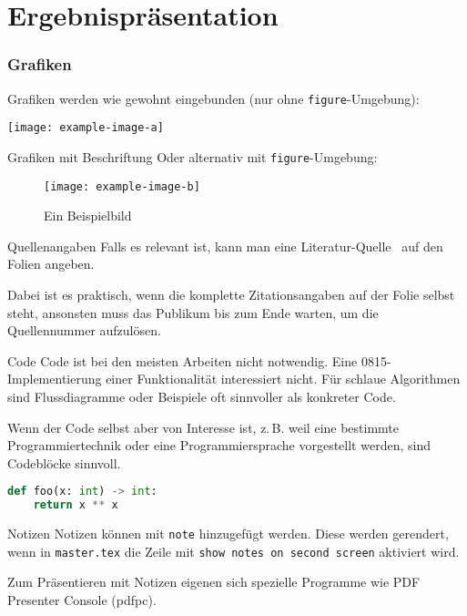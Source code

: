 \section{Ergebnispräsentation}

\begin{frame}
  \frametitle{Grafiken}
  Grafiken werden wie gewohnt eingebunden (nur ohne \texttt{figure}-Umgebung):
  \begin{center}
	    \texttt{[image: example-image-a]}
  \end{center}
\end{frame}

\begin{frame}{Grafiken mit Beschriftung}
Oder alternativ mit \texttt{figure}-Umgebung:
\begin{figure}
\texttt{[image: example-image-b]}
\caption{Ein Beispielbild}
\end{figure}
\end{frame}

\begin{frame}{Quellenangaben}
Falls es relevant ist, kann man eine Literatur-Quelle~ auf den Folien angeben.

Dabei ist es praktisch, wenn die komplette Zitationsangaben auf der Folie selbst steht, ansonsten muss das Publikum bis zum Ende warten, um die Quellennummer aufzulösen.
\end{frame}

\begin{frame}[fragile]{Code} %
    Code ist bei den meisten Arbeiten nicht notwendig. Eine 0815-Implementierung einer Funktionalität interessiert nicht. Für schlaue Algorithmen sind Flussdiagramme oder Beispiele oft sinnvoller als konkreter Code.
    
    Wenn der Code selbst aber von Interesse ist, z.\,B. weil eine bestimmte Programmiertechnik oder eine Programmiersprache vorgestellt werden, sind Codeblöcke sinnvoll.
   
\iffalse
\begin{verbatim}
def foo(x: int) -> int:
    return x ** x
\end{verbatim}

\inputminted[linenos=true]{java}{example.java}
\fi
\begin{lstlisting}[language=python]
def foo(x: int) -> int:
    return x ** x
\end{lstlisting}
\end{frame}

\begin{frame}{Notizen}
  Notizen können mit \texttt{note} hinzugefügt werden. Diese werden gerendert, wenn in \texttt{master.tex} die Zeile mit \texttt{show notes on second screen} aktiviert wird.
  
  Zum Präsentieren mit Notizen eigenen sich spezielle Programme wie PDF Presenter Console (pdfpc).
  
\end{frame}
